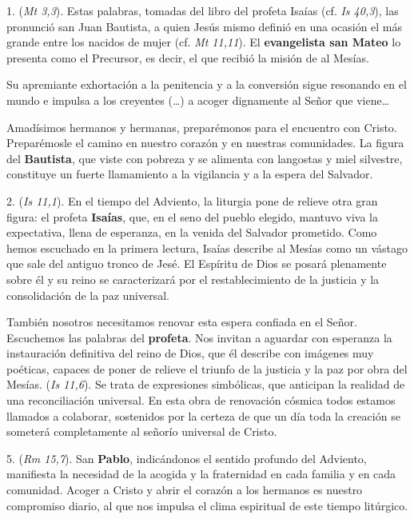 \begin{body}	
	1.  (\emph{Mt 3,3}). Estas palabras, tomadas del libro del profeta Isaías (cf. \emph{Is 40,3}), las pronunció san Juan Bautista, a quien Jesús mismo definió en una ocasión el más grande entre los nacidos de mujer (cf. \emph{Mt 11,11}). El \textbf{evangelista san Mateo} lo presenta como el Precursor, es decir, el que recibió la misión de  al Mesías.
	
	Su apremiante exhortación a la penitencia y a la conversión sigue resonando en el mundo e impulsa a los creyentes (\ldots{}) a acoger dignamente al Señor que viene\ldots{}
	
	Amadísimos hermanos y hermanas, preparémonos para el encuentro con Cristo. Preparémosle el camino en nuestro corazón y en nuestras comunidades. La figura del \textbf{Bautista}, que viste con pobreza y se alimenta con langostas y miel silvestre, constituye un fuerte llamamiento a la vigilancia y a la espera del Salvador.
	
	2.  (\emph{Is 11,1}). En el tiempo del Adviento, la liturgia pone de relieve otra gran figura: el profeta \textbf{Isaías}, que, en el seno del pueblo elegido, mantuvo viva la expectativa, llena de esperanza, en la venida del Salvador prometido. Como hemos escuchado en la primera lectura, Isaías describe al Mesías como un vástago que sale del antiguo tronco de Jesé. El Espíritu de Dios se posará plenamente sobre él y su reino se caracterizará por el restablecimiento de la justicia y la consolidación de la paz universal.
	
	También nosotros necesitamos renovar esta espera confiada en el Señor. Escuchemos las palabras del \textbf{profeta}. Nos invitan a aguardar con esperanza la instauración definitiva del reino de Dios, que él describe con imágenes muy poéticas, capaces de poner de relieve el triunfo de la justicia y la paz por obra del Mesías.  (\emph{Is 11,6}). Se trata de expresiones simbólicas, que anticipan la realidad de una reconciliación universal. En esta obra de renovación cósmica todos estamos llamados a colaborar, sostenidos por la certeza de que un día toda la creación se someterá completamente al señorío universal de Cristo.
	
	5.  (\emph{Rm 15,7}). San \textbf{Pablo}, indicándonos el sentido profundo del Adviento, manifiesta la necesidad de la acogida y la fraternidad en cada familia y en cada comunidad. Acoger a Cristo y abrir el corazón a los hermanos es nuestro compromiso diario, al que nos impulsa el clima espiritual de este tiempo litúrgico.
	

\end{body}

